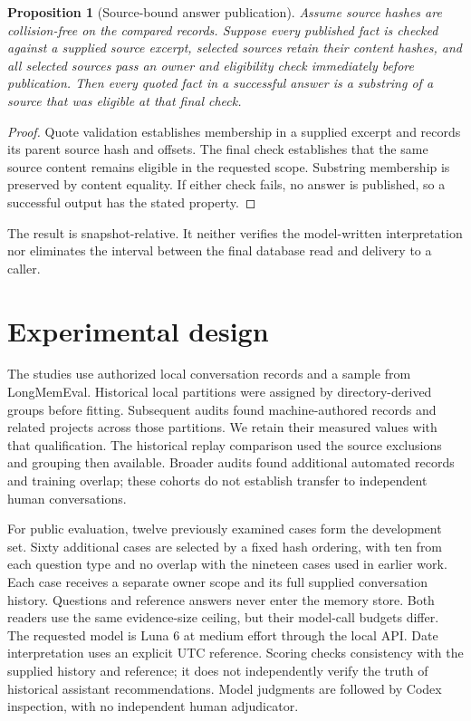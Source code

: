 \documentclass[11pt]{article}
\newtheorem{proposition}[theorem]{Proposition}
\begin{document}
\begin{proposition}[Source-bound answer publication]
Assume source hashes are collision-free on the compared records. Suppose every published fact is checked against a supplied source excerpt, selected sources retain their content hashes, and all selected sources pass an owner and eligibility check immediately before publication. Then every quoted fact in a successful answer is a substring of a source that was eligible at that final check.
\end{proposition}
\begin{proof}
Quote validation establishes membership in a supplied excerpt and records its parent source hash and offsets. The final check establishes that the same source content remains eligible in the requested scope. Substring membership is preserved by content equality. If either check fails, no answer is published, so a successful output has the stated property.
\end{proof}
The result is snapshot-relative. It neither verifies the model-written interpretation nor eliminates the interval between the final database read and delivery to a caller.

\section{Experimental design}
The studies use authorized local conversation records and a sample from LongMemEval. Historical local partitions were assigned by directory-derived groups before fitting. Subsequent audits found machine-authored records and related projects across those partitions. We retain their measured values with that qualification. The historical replay comparison used the source exclusions and grouping then available. Broader audits found additional automated records and training overlap; these cohorts do not establish transfer to independent human conversations.

For public evaluation, twelve previously examined cases form the development set. Sixty additional cases are selected by a fixed hash ordering, with ten from each question type and no overlap with the nineteen cases used in earlier work. Each case receives a separate owner scope and its full supplied conversation history. Questions and reference answers never enter the memory store. Both readers use the same evidence-size ceiling, but their model-call budgets differ. The requested model is Luna 6 at medium effort through the local API. Date interpretation uses an explicit UTC reference. Scoring checks consistency with the supplied history and reference; it does not independently verify the truth of historical assistant recommendations. Model judgments are followed by Codex inspection, with no independent human adjudicator.
\end{document}

